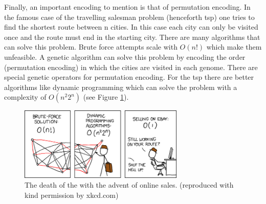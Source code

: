 Finally, an important encoding to mention is that of permutation encoding. In the famous case of the travelling salesman problem (henceforth \gls{tsp}) one tries to find the shortest route between n cities. In this case each city can only be visited once and the route must end in the starting city. There are many algorithms that can solve this problem. Brute force attempts scale with $O(n!)$ which make them unfeasible. A genetic algorithm can solve this problem by encoding the order (permutation encoding) in which the cities are visited in each genome. There are special genetic operators for permutation encoding. For the \gls{tsp} there are better algorithms like dynamic programming which can solve the problem with a complexity of $O(n^2 2^n)$ (see Figure \ref{fig:xkcd_tsp}).

\begin{figure}[htbp] %
   \centering
   \includegraphics[width=0.7\textwidth]{chapter_dalek/plots/travelling_salesman_problem.png} 
   \caption{The death of the  with the advent of online sales. (reproduced with kind permission by xkcd.com)}
   \label{fig:xkcd_tsp}
\end{figure}



